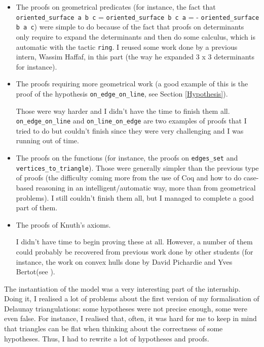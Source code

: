 \documentclass[a4paper,10pt]{article}
\begin{document}
\begin{itemize}
\item The proofs on geometrical predicates (for instance, the fact that {\tt oriented\_surface a b c} = {\tt oriented\_surface b c a} = {- \tt oriented\_surface b a c}) were simple to do because of the fact that proofs on determinants only require to expand the determinants and then do some calculus, which is automatic with the tactic {\tt ring}. I reused some work done by a previous intern, Wassim Haffaf, in this part (the way he expanded 3 x 3 determinants for instance).
\item The proofs requiring more geometrical work (a good example of this is the proof of the hypothesis {\tt on\_edge\_on\_line}, see Section \ref{Hypothesis}).

  Those were way harder and I didn't have the time to finish them all. {\tt on\_edge\_on\_line} and {\tt on\_line\_on\_edge} are two examples of proofs that I tried to do but couldn't finish since they were very challenging and I was running out of time.
  \item The proofs on the functions (for instance, the proofs on {\tt edges\_set} and {\tt vertices\_to\_triangle}). Those were generally simpler than the previous type of proofs (the difficulty coming more from the use of {\sc Coq} and how to do case-based reasoning in an intelligent/automatic way, more than from geometrical problems). I still couldn't finish them all, but I managed to complete a good part of them. 

  \item The proofs of Knuth's axioms.

    I didn't have time to begin proving these at all. However, a number of them could probably be recovered from previous work done by other students (for instance, the work on convex hulls done by David Pichardie and Yves Bertot(see \cite{Hull}).
  \end{itemize}

  The instantiation of the model was a very interesting part of the internship. Doing it, I realised a lot of problems about the first version of my formalisation of Delaunay triangulations: some hypotheses were not precise enough, some were even false. For instance, I realised that, often, it was hard for me to keep in mind that triangles can be flat when thinking about the correctness of some hypotheses. Thus, I had to rewrite a lot of hypotheses and proofs.


\end{document}
